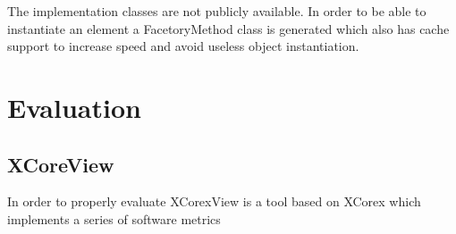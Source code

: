 	The implementation classes are not publicly available.
In order to be able to instantiate an element a FacetoryMethod class is
generated which also has cache support to increase speed and avoid useless
object instantiation.
	
\section {Evaluation}

\subsection {XCoreView}
	In order to properly evaluate
	XCorexView is a tool based on XCorex which implements a series of  software
	metrics



	